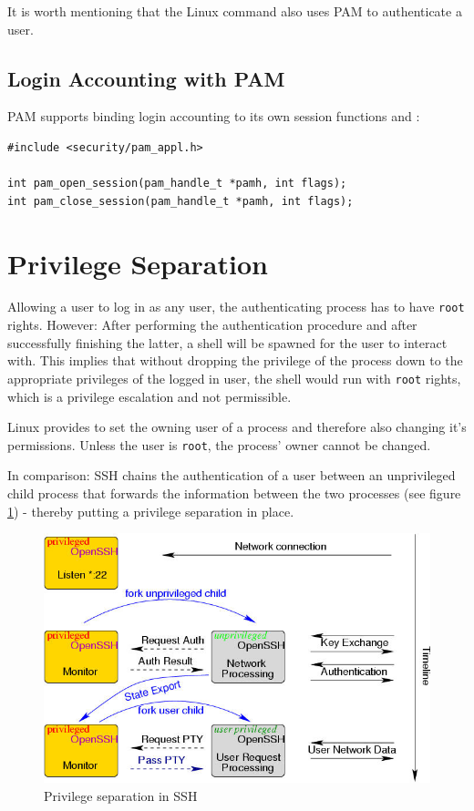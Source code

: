 \documentclass[10pt,a4paper,titlepage,twoside,english,final]{zhawreprt}
\begin{document}
It is worth mentioning that the \gls{Linux} command \cite{login} also uses PAM to authenticate a user.

\subsection{Login Accounting with PAM}\label{ssec:DesignLoginAccountingWithPAM}
\gls{PAM} supports binding \gls{login} accounting to its own session functions \cite{pam_open_session} and \cite{pam_close_session}:
\setlistingC
\begin{lstlisting}[caption={\gls{PAM} session management},label=lst:PAMSessionManagement]
#include <security/pam_appl.h>

int pam_open_session(pam_handle_t *pamh, int flags);
int pam_close_session(pam_handle_t *pamh, int flags);
\end{lstlisting}

\section{Privilege Separation}\label{sec:DesignPrivilegeSeparation}
Allowing a user to log in as any user, the authenticating process has to have \texttt{root} rights.
However: After performing the authentication procedure and after successfully finishing the latter, a \gls{shell} will be spawned for the user to interact with.
This implies that without dropping the privilege of the process down to the appropriate privileges of the logged in user, the \gls{shell} would run with \texttt{root} rights, which is a privilege escalation and not permissible.

\gls{Linux} provides \cite{setuid} to set the owning user of a process and therefore also changing it's permissions.
Unless the user is \texttt{root}, the process' owner cannot be changed.

In comparison: \gls{SSH} chains the authentication of a user between an unprivileged child process that forwards the information between the two processes (see figure \ref{fig:PrivilegeSeparationInSSH}) - thereby putting a privilege separation in place.

\begin{figure}[ht]
\includegraphics[width=\textwidth]{priv}
\caption{Privilege separation in SSH \citep{ProvosSSHPriv}}
\label{fig:PrivilegeSeparationInSSH}
\end{figure}
\end{document}
